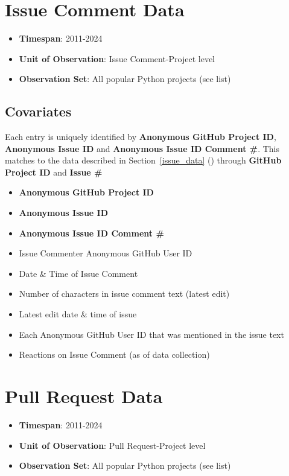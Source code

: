 \documentclass[12pt,notitlepage]{article}
\begin{document}
\section*{Issue Comment Data}
\begin{itemize}
    \item \textbf{Timespan}: 2011-2024
    \item \textbf{Unit of Observation}: Issue Comment-Project level
    \item \textbf{Observation Set}: All popular Python projects (see list)
\end{itemize}
\subsection*{Covariates}
Each entry is uniquely identified by \textbf{Anonymous GitHub Project ID}, \textbf{Anonymous Issue ID} and \textbf{Anonymous Issue ID Comment \#}. 
This matches to the data described in Section~\ref{issue_data} () through \textbf{GitHub Project ID} and \textbf{Issue \#} 
\begin{itemize}
    \item \textbf{Anonymous GitHub Project ID}
    \item \textbf{Anonymous Issue ID}
    \item \textbf{Anonymous Issue ID Comment \#}
    \item Issue Commenter Anonymous GitHub User ID
    \item Date \& Time of Issue Comment
    \item Number of characters in issue comment text (latest edit)
    \item Latest edit date \& time of issue
    \item Each Anonymous GitHub User ID that was mentioned in the issue text
    \item Reactions on Issue Comment (as of data collection)
\end{itemize}

\section{Pull Request Data} \label{pull_request_data}
\begin{itemize}
    \item \textbf{Timespan}: 2011-2024
    \item \textbf{Unit of Observation}: Pull Request-Project level
    \item \textbf{Observation Set}: All popular Python projects (see list)
\end{itemize}
\end{document}

